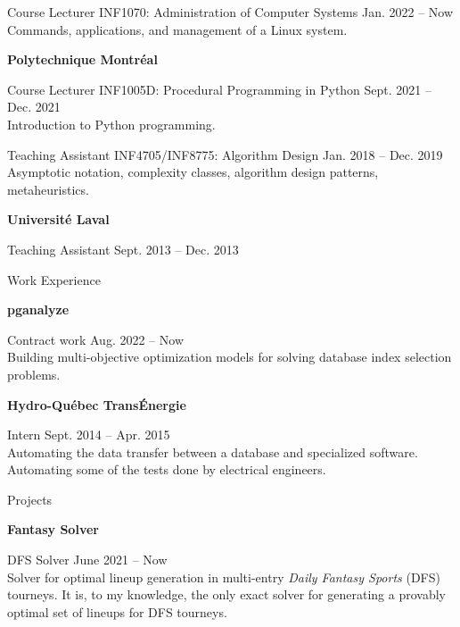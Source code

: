 \documentclass[letterpaper,MMMyyyy,nonstopmode]{simpleresumecv}
\begin{document}
\begin{Body}
Course Lecturer
\BulletItem
INF1070: Administration of Computer Systems
\hfill
Jan. 2022 -- Now
\small \\ Commands, applications, and management of a Linux system. \normalsize

\Gap\Gap
\Entry
\textbf{Polytechnique Montréal}

Course Lecturer
\BulletItem
INF1005D: Procedural Programming in Python
\hfill
Sept. 2021 -- Dec. 2021
\small \\ Introduction to Python programming. \normalsize

\Gap\Gap
Teaching Assistant
\BulletItem
INF4705/INF8775: Algorithm Design
\hfill
Jan. 2018 -- Dec. 2019
\small \\ Asymptotic notation, complexity classes, algorithm design patterns, metaheuristics. \normalsize

\pagebreak %

\Gap\Gap
\Entry
\textbf{Université Laval}

\Gap\Gap
Teaching Assistant
\hfill Sept. 2013 -- Dec. 2013


\Section
{Work \quad\quad Experience}{}{}

\Entry
\textbf{pganalyze}

Contract work
\hfill
Aug. 2022 -- Now
\small \\ Building multi-objective optimization models for solving database index selection problems.\normalsize

\Gap\Gap
\Entry
\textbf{Hydro-Québec TransÉnergie}

Intern
\hfill
Sept. 2014 -- Apr. 2015
\small \\ Automating the data transfer between a database and specialized software. Automating some of the tests done by electrical engineers.\normalsize


\Section
{Projects}{}{}

\Entry
\textbf{Fantasy Solver}

DFS Solver
\hfill
June 2021 -- Now
\small \\ Solver for optimal lineup generation in multi-entry \emph{Daily Fantasy Sports} (DFS) tourneys. It is, to my knowledge, the only exact solver for generating a provably optimal set of lineups for DFS tourneys.\normalsize



\end{Body}
\end{document}
